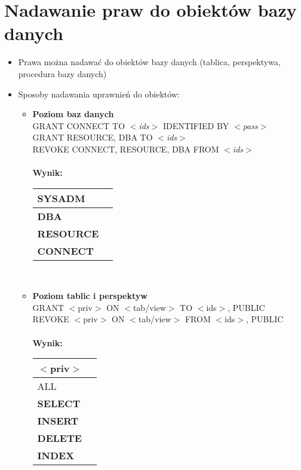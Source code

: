 \documentclass[a4paper,twoside]{article}
\begin{document}
  	\section*{Nadawanie praw do obiektów bazy danych}
  	\begin{itemize}
  		\item Prawa można nadawać do obiektów bazy danych (tablica, perspektywa, procedura bazy danych)
  		\item Sposoby nadawania uprawnień do obiektów:
  		\begin{itemize}
  			\item \textbf{Poziom baz danych}\\
  			GRANT CONNECT TO $ < $\emph{ids}$ > $ IDENTIFIED BY $ < $\emph{pass}$ > $\\
  			GRANT {RESOURCE, DBA} TO $ < $\emph{ids}$ > $\\
  			REVOKE {CONNECT, 
  				RESOURCE, DBA} FROM  $ < $\emph{ids}$ > $\\\\
  			\textbf{Wynik:}\\
  			\begin{tabular}{|l|l|}
  				\hline
  				SYSADM\\
  				\hline
  				\textbf{DBA}\\
  				\hline
  				\textbf{RESOURCE}\\
  				\hline
  				\textbf{CONNECT}\\
  				\hline
  			\end{tabular}\\
  			\item \textbf{Poziom tablic i perspektyw}\\
  			GRANT  $ < $priv$ > $ ON $ < $tab/view$ > $ TO {$ < $ids$ > $, PUBLIC}\\
  			REVOKE $ < $priv$ > $ ON $ < $tab/view$ > $ FROM {$ < $ids$ > $, PUBLIC}\\\\
  			\textbf{Wynik:}\\
  			\begin{tabular}{|l|l|}
  				\hline \textbf{$ < $priv$ > $}\\
  				\hline ALL\\
  				\hline \textbf{SELECT}\\
  				\hline \textbf{INSERT}\\
  				\hline \textbf{DELETE}\\
  				\hline \textbf{INDEX}\\

\end{tabular}
\end{itemize}
\end{itemize}
\end{document}
